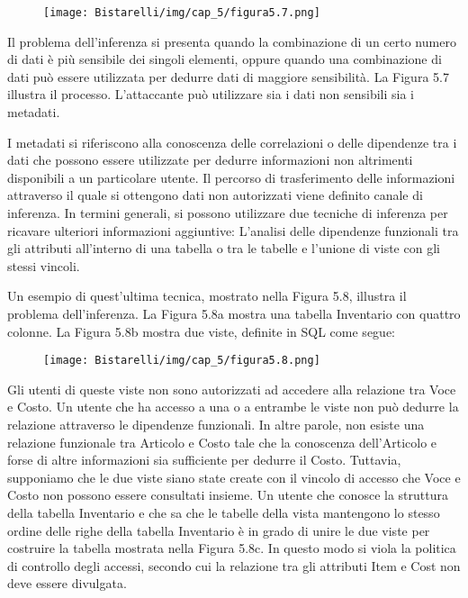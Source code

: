\singlespacing

\begin{figure}[H]
	\centering
    \texttt{[image: Bistarelli/img/cap\_5/figura5.7.png]}
\end{figure}


Il problema dell'inferenza si presenta quando la combinazione di un certo numero di dati è più sensibile dei singoli elementi, oppure quando una combinazione di dati può essere utilizzata per dedurre dati di maggiore sensibilità. La Figura 5.7 illustra il processo. L'attaccante può utilizzare sia i dati non sensibili sia i metadati. 

\singlespacing

I metadati si riferiscono alla conoscenza delle correlazioni o delle dipendenze tra i dati che possono essere utilizzate per dedurre informazioni non altrimenti disponibili a un particolare utente. Il percorso di trasferimento delle informazioni attraverso il quale si ottengono dati non autorizzati viene definito canale di inferenza.
In termini generali, si possono utilizzare due tecniche di inferenza per ricavare ulteriori informazioni aggiuntive: L'analisi delle dipendenze funzionali tra gli attributi all'interno di una tabella o tra le tabelle e l'unione di viste con gli stessi vincoli.

\singlespacing

Un esempio di quest'ultima tecnica, mostrato nella Figura 5.8, illustra il problema dell'inferenza. La Figura 5.8a mostra una tabella Inventario con quattro colonne. La Figura 5.8b mostra due viste, definite in SQL come segue:

\begin{figure}[H]
	\centering
    \texttt{[image: Bistarelli/img/cap\_5/figura5.8.png]}
\end{figure}

Gli utenti di queste viste non sono autorizzati ad accedere alla relazione tra Voce e Costo.
Un utente che ha accesso a una o a entrambe le viste non può dedurre la relazione attraverso le dipendenze funzionali. In altre parole, non esiste una relazione funzionale tra Articolo e Costo tale che la conoscenza dell'Articolo e forse di altre informazioni sia sufficiente per dedurre il Costo. Tuttavia, supponiamo che le due viste siano state create con il vincolo di accesso che Voce e Costo non possono essere consultati insieme. Un utente che conosce la struttura della tabella Inventario e che sa che le tabelle della vista mantengono lo stesso ordine delle righe della tabella Inventario è in grado di unire le due viste per costruire la tabella mostrata nella Figura 5.8c. In questo modo si viola la politica di controllo degli accessi, secondo cui la relazione tra gli attributi Item e Cost non deve essere divulgata.


